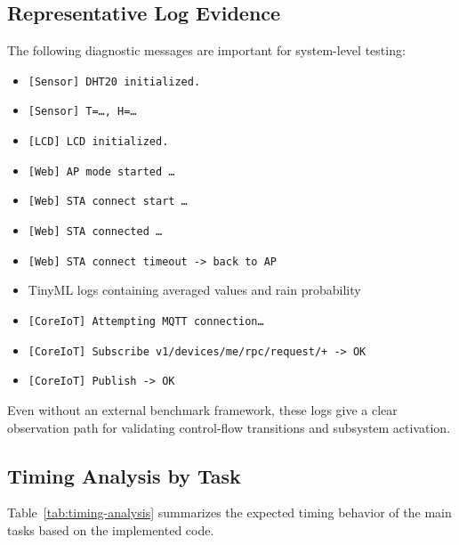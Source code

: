 \subsection{Representative Log Evidence}
The following diagnostic messages are important for system-level testing:
\begin{itemize}
  \item \texttt{[Sensor] DHT20 initialized.}
  \item \texttt{[Sensor] T=\ldots, H=\ldots}
  \item \texttt{[LCD] LCD initialized.}
  \item \texttt{[Web] AP mode started \ldots}
  \item \texttt{[Web] STA connect start \ldots}
  \item \texttt{[Web] STA connected \ldots}
  \item \texttt{[Web] STA connect timeout -> back to AP}
  \item TinyML logs containing averaged values and rain probability
  \item \texttt{[CoreIoT] Attempting MQTT connection\ldots}
  \item \texttt{[CoreIoT] Subscribe v1/devices/me/rpc/request/+ -> OK}
  \item \texttt{[CoreIoT] Publish -> OK}
\end{itemize}

Even without an external benchmark framework, these logs give a clear
observation path for validating control-flow transitions and subsystem
activation.

\subsection{Timing Analysis by Task}
Table~\ref{tab:timing-analysis} summarizes the expected timing behavior of the
main tasks based on the implemented code.


